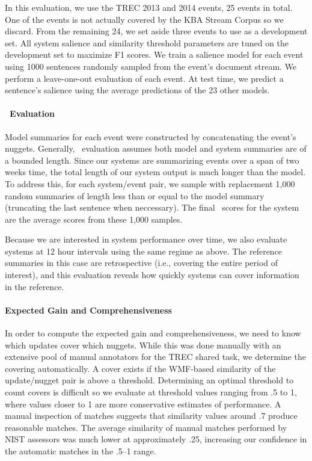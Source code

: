 In this evaluation, we use the TREC 2013 and 2014 events, 25 events in total.
One of the events is not actually covered by the KBA Stream Corpus so we
discard.  From the remaining 24, we set aside three events to use as a
development set. All system salience and similarity threshold parameters are
tuned on the development set to maximize  F1 scores.  We train a
salience model for each event using 1000 sentences randomly sampled from the
event's document stream.  We perform a leave-one-out evaluation of each event.
At test time, we predict a sentence's salience using the average predictions of
the 23 other models.   

\paragraph{\rouge~Evaluation}

Model summaries for each event were constructed by concatenating the event's
nuggets. Generally, \rouge~evaluation assumes both model and system summaries
are of a bounded length. Since our systems are summarizing events over a span
of two weeks time, the total length of our system output is much longer than
the model. To address this, for each system/event pair, we sample with
replacement 1,000 random summaries of length less than or equal to the model
summary (truncating the last sentence when neccessary). The final \rouge~scores
for the system are the average scores from these 1,000 samples.

Because we are interested in system performance over time, we also evaluate
systems at 12 hour intervals using the same regime as above. The reference
summaries in this case are retrospective (i.e., covering the entire period of
interest), and this evaluation reveals how quickly systems can cover
information in the reference.

\paragraph{Expected Gain and Comprehensiveness}

In order to compute the expected gain and comprehensiveness, we need to know
which updates cover which nuggets. While this was done manually with an
extensive pool of manual annotators for the TREC shared task, we determine the
covering automatically.  A cover exists if the WMF-based similarity of the
update/nugget pair is above a threshold.  Determining an optimal threshold to
count covers is difficult so we evaluate at threshold values ranging from .5 to
1, where values closer to 1 are more conservative estimates of performance.  A
manual inspection of matches suggests that similarity values around .7 produce
reasonable matches.  The average similarity of manual matches performed by NIST
assessors was much lower at approximately .25, increasing our confidence in the
automatic matches in the .5--1 range.

